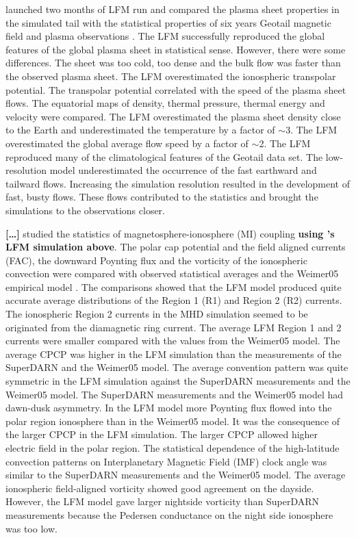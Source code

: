 \documentclass[linenumbers,draft]{agujournal}
\begin{document}
\citet{guild08:_geotail_lfm1,guild08:_geotail_lfm2} launched two months of LFM run and compared the plasma sheet properties in the simulated tail with the statistical properties of six years Geotail magnetic field and plasma observations \citep{kokubun94:_geotail_magnet_field_exper,mukai94:_low_energ_partic_lep_exper_geotail_satel}. The LFM successfully reproduced the global features of the global plasma sheet in statistical sense. However, there were some differences. The sheet was too cold, too dense and the bulk flow was faster than the observed plasma sheet. The LFM overestimated the ionospheric transpolar potential. The transpolar potential correlated with the speed of the plasma sheet flows. The equatorial maps of density, thermal pressure, thermal energy and velocity were compared. The LFM overestimated the plasma sheet density close to the Earth and underestimated the temperature by a factor of $\sim$3. The LFM overestimated the global average flow speed by a factor of $\sim$2. The LFM reproduced many of the climatological features of the Geotail data set. The low-resolution model underestimated the occurrence of the fast earthward and tailward flows. Increasing the simulation resolution resulted in the development of fast, busty flows. These flows contributed to the statistics and brought the simulations to the observations closer.

\citet{zhang11:_lyon_fedder_mobar_mhd} \textbf{[\dots]} studied the statistics of magnetosphere-ionosphere (MI) coupling \textbf{using \citet{guild08:_geotail_lfm1}'s LFM simulation above}. The polar cap potential and the field aligned currents (FAC), the downward Poynting flux and the vorticity of the ionospheric convection were compared with observed statistical averages and the Weimer05 empirical model \citep{weimer05:_improv_joule}. The comparisons showed that the LFM model produced quite accurate average distributions of the Region 1 (R1) and Region 2 (R2) currents. The ionospheric Region 2 currents in the MHD simulation seemed to be originated from the diamagnetic ring current. The average LFM Region 1 and 2 currents were smaller compared with the values from the Weimer05 model. The average CPCP was higher in the LFM simulation than the measurements of the SuperDARN and the Weimer05 model. The average convention pattern was quite symmetric in the LFM simulation against the SuperDARN measurements and the Weimer05 model. The SuperDARN measurements and the Weimer05 model had dawn-dusk asymmetry. In the LFM model more Poynting flux flowed into the polar region ionosphere than in the Weimer05 model. It was the consequence of the larger CPCP in the LFM simulation. The larger CPCP allowed higher electric field in the polar region. The statistical dependence of the high-latitude convection patterns on Interplanetary Magnetic Field (IMF) clock angle was similar to the SuperDARN measurements \citep{sofko95:_direc_super} and the Weimer05 model. The average ionospheric field-aligned vorticity showed good agreement on the dayside. However, the LFM model gave larger nightside vorticity than SuperDARN measurements because the Pedersen conductance on the night side ionosphere was too low. 
\end{document}
